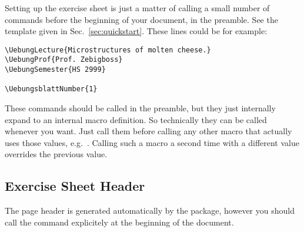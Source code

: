\documentclass[11pt,a4paper]{article}
\begin{document}
Setting up the exercise sheet is just a matter of calling a small number of commands
before the beginning of your document, in the preamble. See the template given in
Sec.~\ref{sec:quickstart}. These lines could be for example:
\begin{pkgverbatim}
\begin{verbatim}
\UebungLecture{Microstructures of molten cheese.}
\UebungProf{Prof. Zebigboss}
\UebungSemester{HS 2999}

\UebungsblattNumber{1}
\end{verbatim}
\end{pkgverbatim}







\begin{pkgtip}
  These commands should be called in the preamble, but they just internally expand to an
  internal macro definition. So technically they can be called whenever you want. Just
  call them before calling any other macro that actually uses those values,
  e.g.~. Calling such a macro a second time with a different
  value overrides the previous value.
\end{pkgtip}

\subsection{Exercise Sheet Header}
\label{sec:Header}

The page header is generated automatically by the package, however you should call the
command  explicitely at the beginning of the document.

\end{document}
